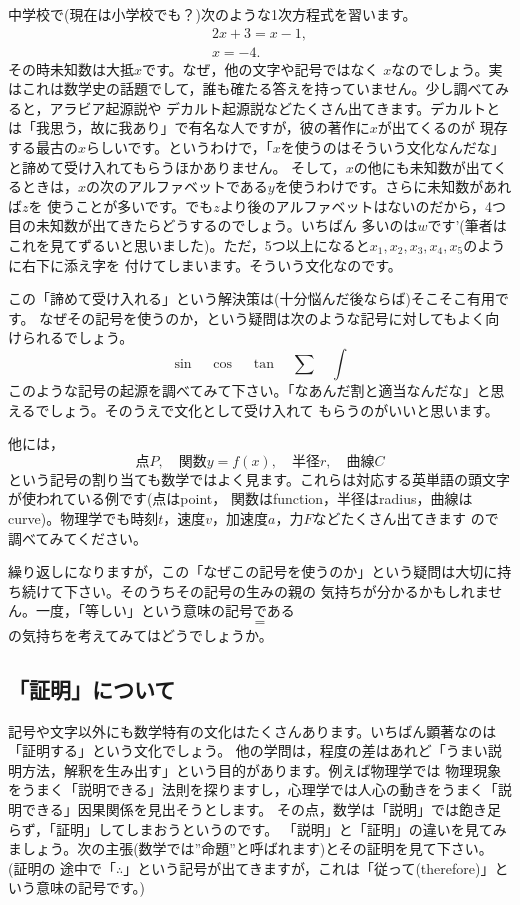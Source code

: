 \documentclass[./main]{subfiles}
\begin{document}
中学校で(現在は小学校でも？)次のような1次方程式を習います。
\begin{gather*}
2x + 3 = x - 1, \\
x = -4.
\end{gather*}
その時未知数は大抵$x$です。なぜ，他の文字や記号ではなく
$x$なのでしょう。実はこれは数学史の話題でして，誰も確たる答えを持っていません。少し調べてみると，アラビア起源説や
デカルト起源説などたくさん出てきます。デカルトとは「我思う，故に我あり」で有名な人ですが，彼の著作に$x$が出てくるのが
現存する最古の$x$らしいです。というわけで，「$x$を使うのはそういう文化なんだな」と諦めて受け入れてもらうほかありません。
そして，$x$の他にも未知数が出てくるときは，$x$の次のアルファベットである$y$を使うわけです。さらに未知数があれば$z$を
使うことが多いです。でも$z$より後のアルファベットはないのだから，4つ目の未知数が出てきたらどうするのでしょう。いちばん
多いのは$w$です'(筆者はこれを見てずるいと思いました)。ただ，5つ以上になると$x_1,x_2,x_3,x_4,x_5$のように右下に添え字を
付けてしまいます。そういう文化なのです。

この「諦めて受け入れる」という解決策は(十分悩んだ後ならば)そこそこ有用です。
なぜその記号を使うのか，という疑問は次のような記号に対してもよく向けられるでしょう。
\[
\sin \quad \cos \quad \tan \quad \sum \quad \int
\]
このような記号の起源を調べてみて下さい。「なあんだ割と適当なんだな」と思えるでしょう。そのうえで文化として受け入れて
もらうのがいいと思います。

他には，
\[点P,\quad 関数y=f(x),\quad 半径r, \quad 曲線C \]
という記号の割り当ても数学ではよく見ます。これらは対応する英単語の頭文字が使われている例です(点はpoint，
関数はfunction，半径はradius，曲線はcurve)。物理学でも時刻$t$，速度$v$，加速度$a$，力$F$などたくさん出てきます
ので調べてみてください。

繰り返しになりますが，この「なぜこの記号を使うのか」という疑問は大切に持ち続けて下さい。そのうちその記号の生みの親の
気持ちが分かるかもしれません。一度，「等しい」という意味の記号である
\[ = \]
の気持ちを考えてみてはどうでしょうか。

\subsection{「証明」について}

記号や文字以外にも数学特有の文化はたくさんあります。いちばん顕著なのは「証明する」という文化でしょう。
他の学問は，程度の差はあれど「うまい説明方法，解釈を生み出す」という目的があります。例えば物理学では
物理現象をうまく「説明できる」法則を探りますし，心理学では人心の動きをうまく「説明できる」因果関係を見出そうとします。
その点，数学は「説明」では飽き足らず，「証明」してしまおうというのです。
「説明」と「証明」の違いを見てみましょう。次の主張(数学では''命題''と呼ばれます)とその証明を見て下さい。(証明の
途中で「$\therefore$」という記号が出てきますが，これは「従って(therefore)」という意味の記号です。)
\end{document}
